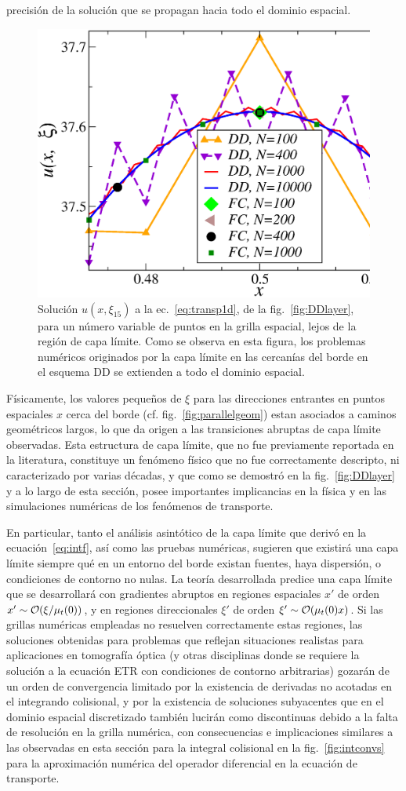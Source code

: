 precisión de la solución que se propagan hacia todo el dominio espacial.
\begin{figure}[h!]
\centering
  \includegraphics[width=0.5\linewidth]{figuras/conv_2.eps}
  \caption{Solución $u(x,\xi_{15})$ a la ec.~\eqref{eq:transp1d}, 
  de la fig.~\ref{fig:DDlayer}, para un número variable 
  de puntos en la grilla espacial, lejos de la región de capa límite. 
  Como se observa en esta figura, 
  los problemas numéricos originados por la capa límite en 
  las cercanías del borde 
  en el esquema DD se extienden a todo el dominio espacial.}
 \label{fig:DDlayer2}
\end{figure}

Físicamente, los valores pequeños de $\xi$ para las direcciones 
entrantes en puntos espaciales $x$ cerca del borde (cf. fig.~\ref{fig:parallelgeom}) 
estan asociados a caminos geométricos largos, lo que da origen 
a las transiciones abruptas de capa límite observadas.
Esta estructura de capa límite, que no fue previamente reportada 
en la literatura, constituye un fenómeno físico que no fue correctamente 
descripto, ni caracterizado por varias décadas, y que como se demostró 
en la fig.~\ref{fig:DDlayer} y a lo largo de esta sección, 
posee importantes implicancias en la física y en las simulaciones 
numéricas de los fenómenos de transporte.

En particular, tanto el análisis asintótico de la capa límite que 
derivó en la ecuación~\eqref{eq:intf}, 
así como las pruebas numéricas, sugieren que existirá una capa límite 
siempre qué en un entorno del borde existan fuentes, haya dispersión, 
o condiciones de contorno no nulas. La teoría desarrollada predice 
una capa límite que se desarrollará con gradientes abruptos en regiones 
espaciales $x'$ de orden $x'\sim \mathcal{O}(\xi/\mu_t(0))$, y en regiones direccionales $\xi'$  
de orden $\xi'\sim \mathcal{O}(\mu_t(0) x)$. Si las grillas numéricas empleadas no resuelven 
correctamente estas regiones, las soluciones obtenidas para problemas 
que reflejan situaciones realistas para aplicaciones en tomografía óptica 
(y otras disciplinas donde se requiere la solución a la ecuación ETR con 
condiciones de contorno arbitrarias) gozarán de un orden de convergencia 
limitado por la existencia de derivadas no acotadas en el integrando 
colisional, y por la existencia de soluciones subyacentes que en el dominio 
espacial discretizado también lucirán como discontinuas debido a la falta de resolución 
en la grilla numérica, 
con consecuencias e implicaciones similares a las observadas 
en esta sección para la integral colisional en la fig.~\ref{fig:intconvs} 
para la aproximación 
numérica del operador diferencial en la ecuación de transporte. 

